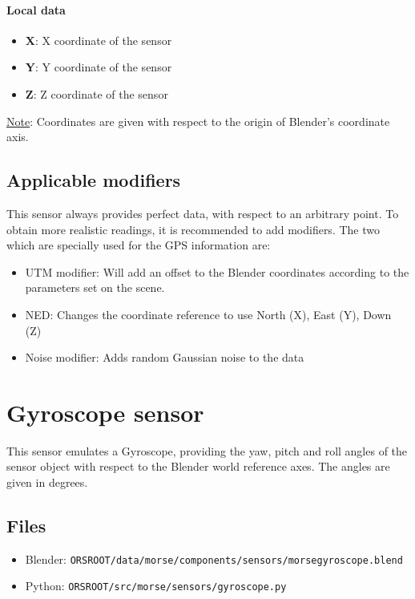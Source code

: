 \documentclass[twoside,a4paper,10pt]{report}
\newcommand{\dokutitlelevelone}[1]{\chapter{#1}}
\newcommand{\dokutitleleveltwo}[1]{\section{#1}}
\newcommand{\dokutitlelevelfour}[1]{\subsubsection{#1}}
\newcommand{\dokubold}[1]{\textbf{#1}}
\newcommand{\dokumonospace}[1]{\texttt{#1}}
\newcommand{\dokuunderline}[1]{\underline{#1}}
\newcommand{\dokuitem}{\item}
\begin{document}
\dokutitlelevelfour{Local data}

\begin{itemize}
\dokuitem  \dokubold{X}: X coordinate of the sensor
\dokuitem  \dokubold{Y}: Y coordinate of the sensor
\dokuitem  \dokubold{Z}: Z coordinate of the sensor
\end{itemize}

\dokuunderline{Note}: Coordinates are given with respect to the origin of Blender's coordinate axis.


\dokutitleleveltwo{Applicable modifiers}
\label{e70c0c8fd69fbf29dc4de09110825004}%

This sensor always provides perfect data, with respect to an arbitrary point.
To obtain more realistic readings, it is recommended to add modifiers.
The two which are specially used for the GPS information are:



\begin{itemize}
\dokuitem  UTM modifier: Will add an offset to the Blender coordinates according to the parameters set on the scene.
\end{itemize}

\begin{itemize}
\dokuitem  NED: Changes the coordinate reference to use North (X), East (Y), Down (Z)
\end{itemize}

\begin{itemize}
\dokuitem  Noise modifier: Adds random Gaussian noise to the data
\end{itemize}

\dokutitlelevelone{Gyroscope sensor}
\label{85d7c1617c515754e4ff7f3604a0776f}%
\label{6b3b2d8500522343e080755f0e0aa4fe}%

This sensor emulates a Gyroscope, providing the yaw, pitch and roll angles of the sensor object with respect to the Blender world reference axes.
The angles are given in degrees.


\dokutitleleveltwo{Files}
\label{45b963397aa40d4a0063e0d85e4fe7a1}%

\begin{itemize}
\dokuitem  Blender: \dokumonospace{{\textdollar}ORS{\textunderscore}ROOT/data/morse/components/sensors/morse{\textunderscore}gyroscope.blend}
\dokuitem  Python: \dokumonospace{{\textdollar}ORS{\textunderscore}ROOT/src/morse/sensors/gyroscope.py}
\end{itemize}
\end{document}
